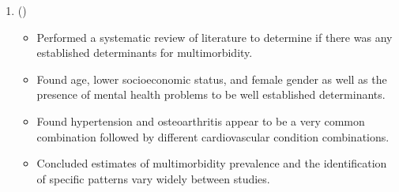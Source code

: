 \documentclass{article}
\begin{document}
\begin{enumerate}
	\item (\citeyear{violan2014prevalence}) \cite{violan2014prevalence} 
	\begin{itemize} 
		\item Performed a systematic review of literature to determine if there was any established determinants for multimorbidity.
		\item Found age, lower socioeconomic status, and female gender as well as the presence of mental health problems to be well established determinants. 
		\item Found hypertension and osteoarthritis appear to be a very common combination followed by different cardiovascular condition combinations. 
		\item Concluded estimates of multimorbidity prevalence and the identification of specific patterns vary widely between studies. 
	\end{itemize}

 \end{enumerate}


\printbibliography
\end{document}
